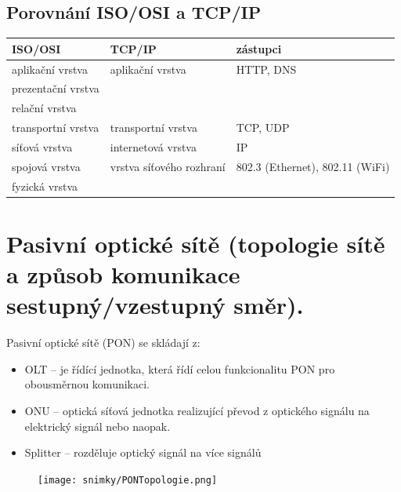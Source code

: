 \subsection{Porovnání ISO/OSI a TCP/IP}

\begin{table}[ht]
    \centering
    \begin{tabular}{lll}
        \textbf{ISO/OSI}   & \textbf{TCP/IP}          & zástupci                        \\
        \hline \hline
        aplikační vrstva   & aplikační vrstva         & HTTP, DNS                       \\
        prezentační vrstva &                          &                                 \\
        relační vrstva     &                          &                                 \\
        \hline
        transportní vrstva & transportní vrstva       & TCP, UDP                        \\
        \hline
        síťová vrstva      & internetová vrstva       & IP                              \\
        \hline
        spojová vrstva     & vrstva síťového rozhraní & 802.3 (Ethernet), 802.11 (WiFi) \\
        fyzická vrstva     &                          &                                 \\
    \end{tabular}
    \label{Srovnání modelů ISO/OSI a TCP/IP}
\end{table}


\clearpage
\section{Pasivní optické sítě (topologie sítě a způsob komunikace sestupný/vzestupný směr).}
Pasivní optické sítě (PON) se skládají z:
\begin{itemize}
    \item OLT -- je řídící jednotka, která řídí celou funkcionalitu PON pro obousměrnou komunikaci.
    \item ONU -- optická síťová jednotka realizující převod z optického signálu na elektrický signál nebo naopak.
    \item Splitter -- rozděluje optický signál na více signálů
\end{itemize}
\begin{figure} [h]
    \centering
    \texttt{[image: snimky/PONTopologie.png]}
    \label{fig:pon}
\end{figure}

